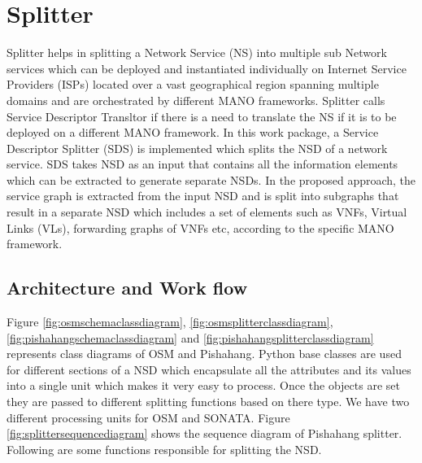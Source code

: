 \section{Splitter}
Splitter helps in splitting a Network Service (NS) into multiple sub Network services which can be deployed and instantiated individually on Internet Service Providers (ISPs) located over a vast geographical region spanning multiple domains and are orchestrated by different MANO frameworks. Splitter calls Service Descriptor Transltor if there is a need to translate the NS if it is to be deployed on a different MANO framework. In this work package, a Service Descriptor Splitter (SDS) is implemented which splits the NSD of a network service. SDS takes NSD as an input that contains all the information elements which can be extracted to generate separate NSDs. In the proposed approach, the service graph is extracted from the input NSD and is split into subgraphs that result in a separate NSD which includes a set of elements such as VNFs, Virtual Links (VLs), forwarding graphs of VNFs etc, according to the specific MANO framework.

\subsection{Architecture and Work flow}

Figure \ref{fig:osmschemaclassdiagram}, \ref{fig:osmsplitterclassdiagram}, \ref{fig:pishahangschemaclassdiagram} and \ref{fig:pishahangsplitterclassdiagram} represents class diagrams of OSM and Pishahang. Python base classes are used for different sections of a NSD which encapsulate all the attributes and its values into a single unit which makes it very easy to process. Once the objects are set they are passed to different splitting functions based on there type. We have two different processing units for OSM and SONATA. Figure \ref{fig:splittersequencediagram} shows the sequence diagram of Pishahang splitter. Following are some functions responsible for splitting the NSD.

